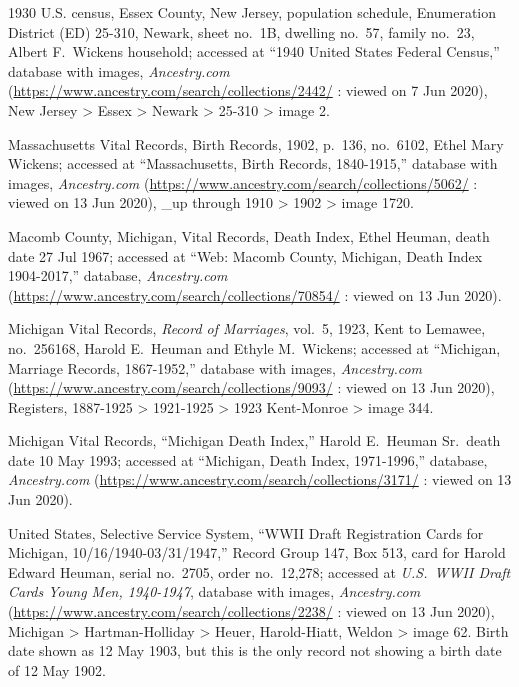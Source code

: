 \begin{thebibliography}{999}
1930 U.S. census, Essex County, New Jersey, population schedule, Enumeration District (ED) 25-310, Newark, sheet no.\ 1B, dwelling no.\ 57, family no.\ 23, Albert F.\ Wickens household; accessed at ``1940 United States Federal Census,'' database with images, \textit{Ancestry.com} (\url{https://www.ancestry.com/search/collections/2442/} : viewed on 7 Jun 2020), New Jersey > Essex > Newark > 25-310 > image 2.


Massachusetts Vital Records, Birth Records, 1902, p.\ 136, no.\ 6102, Ethel Mary Wickens; accessed at ``Massachusetts, Birth Records, 1840-1915,'' database with images, \textit{Ancestry.com} (\url{https://www.ancestry.com/search/collections/5062/} : viewed on 13 Jun 2020), \_up through 1910 > 1902 > image 1720.

Macomb County, Michigan, Vital Records, Death Index, Ethel Heuman, death date 27 Jul 1967; accessed at ``Web: Macomb County, Michigan, Death Index 1904-2017,'' database, \textit{Ancestry.com} (\url{https://www.ancestry.com/search/collections/70854/} : viewed on 13 Jun 2020).

Michigan Vital Records, \textit{Record of Marriages}, vol.\ 5, 1923, Kent to Lemawee, no.\ 256168, Harold E.\ Heuman and Ethyle M.\ Wickens; accessed at ``Michigan, Marriage Records, 1867-1952,'' database with images, \textit{Ancestry.com} (\url{https://www.ancestry.com/search/collections/9093/} : viewed on 13 Jun 2020),  Registers, 1887-1925 > 1921-1925 > 1923 Kent-Monroe > image 344.

Michigan Vital Records, ``Michigan Death Index,'' Harold E.\ Heuman Sr.\, death date 10 May 1993; accessed at ``Michigan, Death Index, 1971-1996,'' database, \textit{Ancestry.com} (\url{https://www.ancestry.com/search/collections/3171/} : viewed on 13 Jun 2020).

United States, Selective Service System, ``WWII Draft Registration Cards for Michigan, 10/16/1940-03/31/1947,'' Record Group 147, Box 513, card for Harold Edward Heuman, serial no.\ 2705, order no.\ 12,278; accessed at \textit{U.S.\ WWII Draft Cards Young Men, 1940-1947}, database with images, \textit{Ancestry.com} (\url{https://www.ancestry.com/search/collections/2238/} : viewed on 13 Jun 2020), Michigan > Hartman-Holliday > Heuer, Harold-Hiatt, Weldon > image 62.
Birth date shown as 12 May 1903, but this is the only record not showing a birth date of 12 May 1902.


\end{thebibliography}
